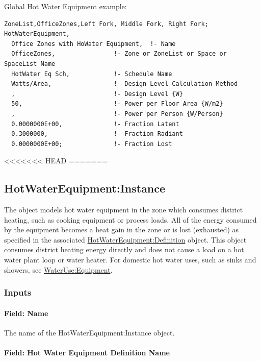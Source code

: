 Global Hot Water Equipment example:

\begin{lstlisting}
ZoneList,OfficeZones,Left Fork, Middle Fork, Right Fork;
HotWaterEquipment,
  Office Zones with HoWater Equipment,  !- Name
  OfficeZones,                !- Zone or ZoneList or Space or SpaceList Name
  HotWater Eq Sch,            !- Schedule Name
  Watts/Area,                 !- Design Level Calculation Method
  ,                           !- Design Level {W}
  50,                         !- Power per Floor Area {W/m2}
  ,                           !- Power per Person {W/Person}
  0.0000000E+00,              !- Fraction Latent
  0.3000000,                  !- Fraction Radiant
  0.0000000E+00;              !- Fraction Lost
\end{lstlisting}

<<<<<<< HEAD
=======

\subsection{HotWaterEquipment:Instance}\label{hotwaterequipmentinstance}

The object models hot water equipment in the zone which consumes district heating, such as cooking equipment or process loads. All of the energy consumed by the equipment becomes a heat gain in the zone or is lost (exhausted) as specified in the associated \hyperref[hotwaterequipmentdefinition]{HotWaterEquipment:Definition} object. This object consumes district heating energy directly and does not cause a load on a hot water plant loop or water heater. For domestic hot water uses, such as sinks and showers, see \hyperref[wateruseequipment]{WaterUse:Equipment}.

\subsubsection{Inputs}\label{inputs-5-015-hw-instance}

\paragraph{Field: Name}\label{field-name-5-011-hw-instance}

The name of the HotWaterEquipment:Instance object.

\paragraph{Field: Hot Water Equipment Definition Name}\label{field-hot-water-equipment-definition-name}

